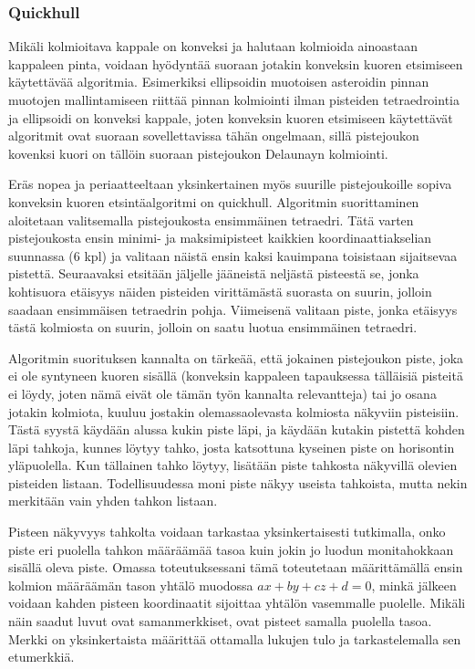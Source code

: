 \documentclass[12pt,a4paper,titlepage]{article}
\begin{document}
\subsubsection{Quickhull}\label{quickhull}
Mikäli kolmioitava kappale on konveksi ja halutaan kolmioida ainoastaan kappaleen pinta, voidaan hyödyntää suoraan jotakin konveksin kuoren etsimiseen käytettävää algoritmia\cite{maur2002delaunay}. Esimerkiksi ellipsoidin muotoisen asteroidin pinnan muotojen mallintamiseen riittää pinnan kolmiointi ilman pisteiden tetraedrointia ja ellipsoidi on konveksi kappale, joten konveksin kuoren etsimiseen käytettävät algoritmit ovat suoraan sovellettavissa tähän ongelmaan, sillä pistejoukon kovenksi kuori on tällöin suoraan pistejoukon Delaunayn kolmiointi.

Eräs nopea ja periaatteeltaan yksinkertainen myös suurille pistejoukoille sopiva konveksin kuoren etsintäalgoritmi on quickhull. Algoritmin suorittaminen aloitetaan valitsemalla pistejoukosta ensimmäinen tetraedri. Tätä varten pistejoukosta ensin minimi- ja maksimipisteet kaikkien koordinaattiakselian suunnassa (6 kpl) ja valitaan näistä ensin kaksi kauimpana toisistaan sijaitsevaa pistettä. Seuraavaksi etsitään jäljelle jääneistä neljästä pisteestä se, jonka kohtisuora etäisyys näiden pisteiden virittämästä suorasta on suurin, jolloin saadaan ensimmäisen tetraedrin pohja. Viimeisenä valitaan piste, jonka etäisyys tästä kolmiosta on suurin, jolloin on saatu luotua ensimmäinen tetraedri. \cite{quickhull}

Algoritmin suorituksen kannalta on tärkeää, että jokainen pistejoukon piste, joka ei ole syntyneen kuoren sisällä (konveksin kappaleen tapauksessa tälläisiä pisteitä ei löydy, joten nämä eivät ole tämän työn kannalta relevantteja) tai jo osana jotakin kolmiota, kuuluu jostakin olemassaolevasta kolmiosta näkyviin pisteisiin. Tästä syystä käydään alussa kukin piste läpi, ja käydään kutakin pistettä kohden läpi tahkoja, kunnes löytyy tahko, josta katsottuna kyseinen piste on horisontin yläpuolella. Kun tällainen tahko löytyy, lisätään piste tahkosta näkyvillä olevien pisteiden listaan. Todellisuudessa moni piste näkyy useista tahkoista, mutta nekin merkitään vain yhden tahkon listaan.\cite{quickhull}

Pisteen näkyvyys tahkolta voidaan tarkastaa yksinkertaisesti tutkimalla, onko piste eri puolella tahkon määräämää tasoa kuin jokin jo luodun monitahokkaan sisällä oleva piste. Omassa toteutuksessani tämä toteutetaan määrittämällä ensin kolmion määräämän tason yhtälö muodossa $ax+by+cz+d=0$, minkä jälkeen voidaan kahden pisteen koordinaatit sijoittaa yhtälön vasemmalle puolelle. Mikäli näin saadut luvut ovat samanmerkkiset, ovat pisteet samalla puolella tasoa. Merkki on yksinkertaista määrittää ottamalla lukujen tulo ja tarkastelemalla sen etumerkkiä.
\end{document}
